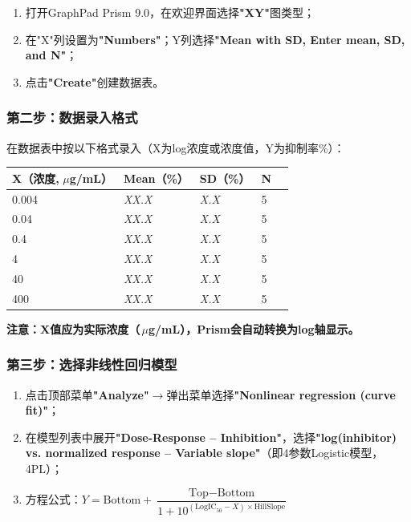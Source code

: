 \documentclass[12pt,a4paper]{article}
\newcommand{\um}{\,$\mu$g/mL}
\begin{document}
\begin{enumerate}
\item 打开GraphPad Prism 9.0，在欢迎界面选择\textbf{"XY"}图类型；
\item 在"X"列设置为\textbf{"Numbers"}；Y列选择\textbf{"Mean with SD, Enter mean, SD, and N"}；
\item 点击\textbf{"Create"}创建数据表。
\end{enumerate}

\subsubsection{第二步：数据录入格式}

在数据表中按以下格式录入（X为log浓度或浓度值，Y为抑制率\%）：

\begin{center}
\begin{tabular}{lllll}
\toprule
\textbf{X（浓度,\,\um{}）} & \textbf{Mean（\%）} & \textbf{SD（\%）} & \textbf{N} \\
\midrule
0.004 & \textit{XX.X} & \textit{X.X} & 5 \\
0.04 & \textit{XX.X} & \textit{X.X} & 5 \\
0.4 & \textit{XX.X} & \textit{X.X} & 5 \\
4 & \textit{XX.X} & \textit{X.X} & 5 \\
40 & \textit{XX.X} & \textit{X.X} & 5 \\
400 & \textit{XX.X} & \textit{X.X} & 5 \\
\bottomrule
\end{tabular}
\end{center}

\textbf{注意：X值应为实际浓度（\um{}），Prism会自动转换为log轴显示。}

\subsubsection{第三步：选择非线性回归模型}

\begin{enumerate}
\item 点击顶部菜单\textbf{"Analyze"}$\to$弹出菜单选择\textbf{"Nonlinear regression (curve fit)"}；
\item 在模型列表中展开\textbf{"Dose-Response -- Inhibition"}，选择\textbf{"log(inhibitor) vs. normalized response -- Variable slope"}（即4参数Logistic模型，4PL）\cite{ref27}；
\item 方程公式：$Y = \text{Bottom} + \dfrac{\text{Top}-\text{Bottom}}{1+10^{(\text{LogIC}_{50}-X)\times\text{HillSlope}}}$
\end{enumerate}
\end{document}

